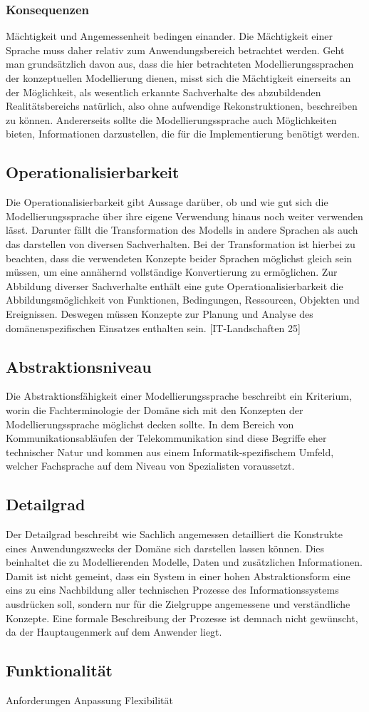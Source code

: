 \subsubsection{Konsequenzen}
Mächtigkeit und Angemessenheit bedingen einander. Die Mächtigkeit einer Sprache muss daher relativ
zum Anwendungsbereich betrachtet werden. Geht man grundsätzlich davon aus, dass die hier betrachteten
Modellierungssprachen der konzeptuellen Modellierung dienen, misst sich die Mächtigkeit einerseits
an der Möglichkeit, als wesentlich erkannte Sachverhalte des abzubildenden Realitätsbereichs
natürlich, also ohne aufwendige Rekonstruktionen, beschreiben zu können. Andererseits sollte die
Modellierungssprache auch Möglichkeiten bieten, Informationen darzustellen, die für die Implementierung
benötigt werden.

\subsection{Operationalisierbarkeit}
\label{ssc:Operationalisierbarkeit}
Die Operationalisierbarkeit gibt Aussage darüber, ob und wie gut sich die Modellierungssprache über ihre eigene Verwendung hinaus noch weiter verwenden lässt.
Darunter fällt die Transformation des Modells in andere Sprachen als auch das darstellen von diversen Sachverhalten.
Bei der Transformation ist hierbei zu beachten, dass die verwendeten Konzepte beider Sprachen möglichst gleich sein müssen,
um eine annähernd vollständige Konvertierung zu ermöglichen. Zur Abbildung diverser Sachverhalte enthält eine gute Operationalisierbarkeit die Abbildungsmöglichkeit von Funktionen, Bedingungen, Ressourcen, Objekten und Ereignissen.
Deswegen müssen Konzepte zur Planung und Analyse des domänenspezifischen Einsatzes enthalten sein.
[IT-Landschaften 25]

\subsection{Abstraktionsniveau}
\label{ssc:Abstraktionsniveau}
Die Abstraktionsfähigkeit einer Modellierungssprache beschreibt ein Kriterium, worin die Fachterminologie der Domäne sich mit den Konzepten der Modellierungssprache möglichst decken sollte. In dem Bereich von Kommunikationsabläufen der Telekommunikation sind diese Begriffe eher technischer Natur und kommen aus einem Informatik-spezifischem Umfeld, welcher Fachsprache auf dem Niveau von Spezialisten voraussetzt. 

\subsection{Detailgrad}
\label{ssc:Detailgrad}
Der Detailgrad beschreibt wie Sachlich angemessen detailliert die Konstrukte eines Anwendungszwecks der Domäne sich darstellen lassen können. Dies beinhaltet die zu Modellierenden Modelle, Daten und zusätzlichen Informationen. Damit ist nicht gemeint, dass ein System in einer hohen Abstraktionsform eine eins zu eins Nachbildung 
aller technischen Prozesse des Informationssystems ausdrücken soll, sondern nur für die Zielgruppe angemessene und verständliche Konzepte. Eine formale Beschreibung der Prozesse ist demnach nicht gewünscht, da der Hauptaugenmerk auf dem Anwender liegt.

\subsection{Funktionalität}
\label{ssc:Funktionalität}
Anforderungen
Anpassung
Flexibilität

